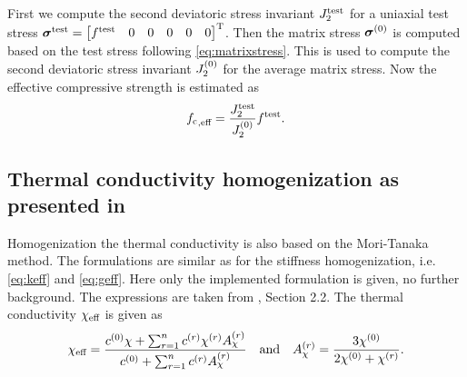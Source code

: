 First we compute the second deviatoric stress invariant $J_2^{\text{test}}$ for a uniaxial test stress $\boldsymbol{\sigma}^{\text{test}} = \begin{bmatrix} f^{\text{test}} & 0 & 0 &0&0&0 \end{bmatrix}^\text{T}$. Then the matrix stress $\boldsymbol{\sigma}^{(0)}$ is computed based on the test stress following \eqref{eq:matrixstress}. This is used to compute the second deviatoric stress invariant $J_2^{(0)}$ for the average matrix stress.
Now the effective compressive strength is estimated as
\begin{align}
	{f_{\text{c}}}_{,\text{eff}} = \frac{J_2^{\text{test}}}{J_2^{(0)}} f^{\text{test}}.
\end{align}


\subsection{Thermal conductivity homogenization as presented in \cite{str_2011_mbeo}}
Homogenization the thermal conductivity is also based on the Mori-Tanaka method.
The formulations are similar as for the stiffness homogenization, i.e. \eqref{eq:keff} and \eqref{eq:geff}.
Here only the implemented formulation is given, no further background.
The expressions are taken from \cite{str_2011_mbeo}, Section 2.2.
The thermal conductivity $\chi_{\text{eff}}$ is given as
\begin{align}
	\chi_{\text{eff}} = \dfrac{c^{(0)}\chi + \sum^{n}_{r=1} c^{(r)} \chi^{(r)} A_{\chi}^{(r)}}{c^{(0)} + \sum^{n}_{r=1} c^{(r)} A_{\chi}^{(r)}}\quad\text{and}\quad
	A_{\chi}^{(r)} = \frac{3\chi^{(0)}}{2\chi^{(0)}+\chi^{(r)}}.
\end{align}
